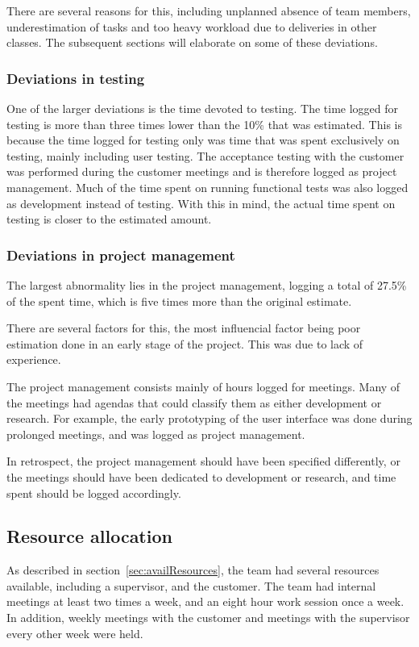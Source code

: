 There are several reasons for this, including unplanned absence of team members, underestimation of tasks and too heavy workload due to deliveries in other classes. The subsequent sections will elaborate on some of these deviations.

\subsubsection{Deviations in testing}
One of the larger deviations is the time devoted to testing. The time logged for testing is more than three times lower than the 10\% that was estimated. This is because the time logged for testing only was time that was spent exclusively on testing, mainly including user testing. The acceptance testing with the customer was performed during the customer meetings and is therefore logged as project management. Much of the time spent on running functional tests was also logged as development instead of testing. With this in mind, the actual time spent on testing is closer to the estimated amount.

\subsubsection{Deviations in project management}
The largest abnormality lies in the project management, logging a total of 27.5\% of the spent time, which is five times more than the original estimate. 

There are several factors for this, the most influencial factor being poor estimation done in an early stage of the project. This was due to lack of experience. 

The project management consists mainly of hours logged for meetings. Many of the meetings had agendas that could classify them as either development or research. For example, the early prototyping of the user interface was done during prolonged meetings, and was logged as project management. 

In retrospect, the project management should have been specified differently, or the meetings should have been dedicated to development or research, and time spent should be logged accordingly.

\subsection{Resource allocation}
As described in section~\ref{sec:availResources}, the team had several resources available, including a supervisor, and the customer. The team had internal meetings at least two times a week, and an eight hour work session once a week. In addition, weekly meetings with the customer and meetings with the supervisor every other week were held.

